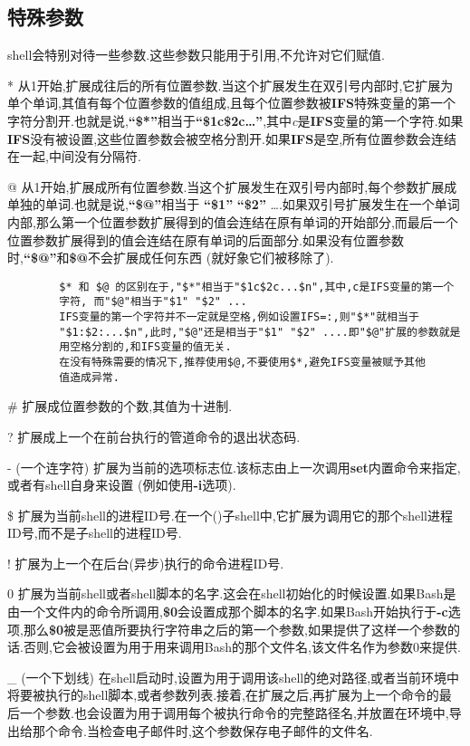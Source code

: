 \documentclass[draft,openany]{book}
\begin{document}
\begin{CJK}{UTF8}{gbsn}
    \subsection{特殊参数}
    shell会特别对待一些参数.这些参数只能用于引用,不允许对它们赋值.
    \begin{basedescript}{\desclabelstyle{\nextlinelabel}\desclabelwidth{2.5em}}
    \item[*] 从1开始,扩展成往后的所有位置参数.当这个扩展发生在双引号内部时,它扩展为单个单词,其值有每个位置参数的值组成,且每个位置参数被\textbf{IFS}特殊变量的第一个字符分割开.也就是说,\textbf{``\$*''}相当于\textbf{``\$1c\$2c\ldots''},其中\emph{c}是\textbf{IFS}变量的第一个字符.如果\textbf{IFS}没有被设置,这些位置参数会被空格分割开.如果\textbf{IFS}是空,所有位置参数会连结在一起,中间没有分隔符.
    \item[@] 从1开始,扩展成所有位置参数.当这个扩展发生在双引号内部时,每个参数扩展成单独的单词.也就是说,\textbf{``\$@''}相当于 \textbf{``\$1''} \textbf{``\$2''} \ldots.如果双引号扩展发生在一个单词内部,那么第一个位置参数扩展得到的值会连结在原有单词的开始部分,而最后一个位置参数扩展得到的值会连结在原有单词的后面部分.如果没有位置参数时,\textbf{``\$@''}和\textbf{\$@}不会扩展成任何东西 (就好象它们被移除了).
        \begin{verbatim}
        $* 和 $@ 的区别在于,"$*"相当于"$1c$2c...$n",其中,c是IFS变量的第一个
        字符, 而"$@"相当于"$1" "$2" ...
        IFS变量的第一个字符并不一定就是空格,例如设置IFS=:,则"$*"就相当于
        "$1:$2:...$n",此时,"$@"还是相当于"$1" "$2" ....即"$@"扩展的参数就是
        用空格分割的,和IFS变量的值无关.
        在没有特殊需要的情况下,推荐使用$@,不要使用$*,避免IFS变量被赋予其他
        值造成异常.
        \end{verbatim}
    \item[\#] 扩展成位置参数的个数,其值为十进制.
    \item[?] 扩展成上一个在前台执行的管道命令的退出状态码.
    \item[-] (一个连字符) 扩展为当前的选项标志位.该标志由上一次调用\textbf{set}内置命令来指定,或者有shell自身来设置 (例如使用\textbf{-i}选项).
    \item[\$] 扩展为当前shell的进程ID号.在一个()子shell中,它扩展为调用它的那个shell进程ID号,而不是子shell的进程ID号.
    \item[!] 扩展为上一个在后台(异步)执行的命令进程ID号.
    \item[0] 扩展为当前shell或者shell脚本的名字.这会在shell初始化的时候设置.如果Bash是由一个文件内的命令所调用,\textbf{\$0}会设置成那个脚本的名字.如果Bash开始执行于\textbf{-c}选项,那么\textbf{\$0}被是恶值所要执行字符串之后的第一个参数,如果提供了这样一个参数的话.否则,它会被设置为用于用来调用Bash的那个文件名,该文件名作为参数0来提供.
    \item[\_] (一个下划线) 在shell启动时,设置为用于调用该shell的绝对路径,或者当前环境中将要被执行的shell脚本,或者参数列表.接着,在扩展之后,再扩展为上一个命令的最后一个参数.也会设置为用于调用每个被执行命令的完整路径名,并放置在环境中,导出给那个命令.当检查电子邮件时,这个参数保存电子邮件的文件名.
    \end{basedescript}


\end{CJK}
\end{document}
